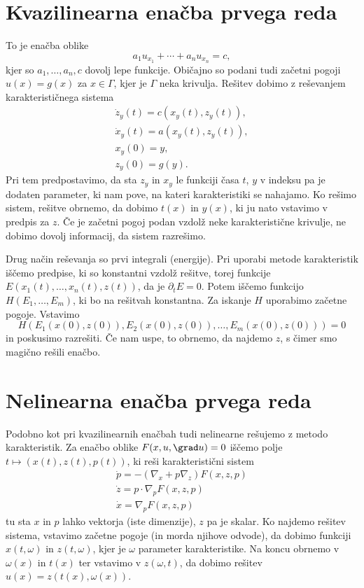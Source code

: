 \section{Kvazilinearna enačba prvega reda}

To je enačba oblike
\[
	a_1 u_{x_1} + \cdots + a_n u_{x_n} = c,
\]
kjer so $a_1, \ldots, a_n, c$ dovolj lepe funkcije.
Običajno so podani tudi začetni pogoji $u(x) = g(x)$ za $x \in \Gamma$, kjer je
$\Gamma$ neka krivulja.
Rešitev dobimo z reševanjem karakterističnega sistema
\begin{gather*}
	\dot{z}_y(t) = c(x_y(t), z_y(t)), \\
	\dot{x}_y(t) = a(x_y(t), z_y(t)), \\
	x_y(0) = y, \\
	z_y(0) = g(y).
\end{gather*}
Pri tem predpostavimo, da sta $z_y$ in $x_y$ le funkciji časa $t$, $y$ v indeksu
pa je dodaten parameter, ki nam pove, na kateri karakteristiki se nahajamo.
Ko rešimo sistem, rešitve obrnemo, da dobimo $t(x)$ in $y(x)$, ki ju nato
vstavimo v predpis za $z$.
Če je začetni pogoj podan vzdolž neke karakteristične krivulje, ne dobimo dovolj
informacij, da sistem razrešimo.

Drug način reševanja so prvi integrali (energije).
Pri uporabi metode karakteristik iščemo predpise, ki so konstantni vzdolž
rešitve, torej funkcije $E(x_1(t), \ldots, x_n(t), z(t))$, da je $\partial_t E =
0$.
Potem iščemo funkcijo $H(E_1, \ldots, E_m)$, ki bo na rešitvah konstantna.
Za iskanje $H$ uporabimo začetne pogoje.
Vstavimo
\[
  H(E_1(x(0), z(0)), E_2(x(0), z(0)), \ldots, E_m(x(0), z(0))) = 0
\]
in poskusimo razrešiti.
Če nam uspe, to obrnemo, da najdemo $z$, s čimer smo magično rešili enačbo.

\section{Nelinearna enačba prvega reda}

Podobno kot pri kvazilinearnih enačbah tudi nelinearne rešujemo z metodo
karakteristik.
Za enačbo oblike $F(x, u, \grad u) = 0$ iščemo polje $t \mapsto (x(t), z(t),
p(t))$, ki reši karakteristični sistem
\begin{gather*}
  \dot{p} = - (\nabla_x + p \nabla_z) F(x,z,p) \\
  \dot{z} = p \cdot \nabla_p F(x, z, p) \\
  \dot{x} = \nabla_p F(x, z, p)
\end{gather*}
tu sta $x$ in $p$ lahko vektorja (iste dimenzije), $z$ pa je skalar.
Ko najdemo rešitev sistema, vstavimo začetne pogoje (in morda njihove odvode),
da dobimo funkciji $x(t,\omega)$ in $z(t, \omega)$, kjer je $\omega$ parameter
karakteristike.
Na koncu obrnemo v $\omega(x)$ in $t(x)$ ter vstavimo v $z(\omega, t)$, da
dobimo rešitev $u(x) = z(t(x), \omega(x))$.

